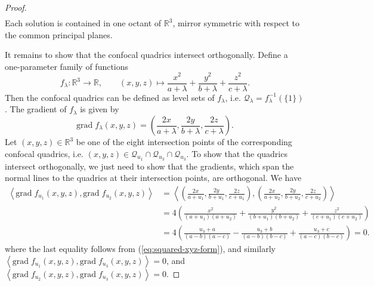\documentclass[10pt, a4paper]{article}
\theoremstyle{BoldTopSpacing}
\theoremstyle{BoldTopSpacing}
\theoremstyle{BoldTopSpacing}
\theoremstyle{BoldTopBottomSpacing}
\theoremstyle{BoldTopSpacing}
\theoremstyle{BoldTopBottomSpacing}
\theoremstyle{remark}
\begin{document}
\begin{proof}
\begin{equation}
\begin{aligned}
\end{aligned}
\end{equation}
Each solution is contained in one octant of $\mathbb{R}^3$, mirror symmetric with respect to the common principal planes. \par
It remains to show that the confocal quadrics intersect orthogonally. Define a one-parameter family of functions
\[
    f_{\lambda} : \mathbb{R}^3 \to \mathbb{R}, \quad \quad (x, y, z) \mapsto \frac{x^2}{a + \lambda} + \frac{y^2}{b + \lambda} + \frac{z^2}{c + \lambda}.
\]
Then the confocal quadrics can be defined as level sets of $f_{\lambda}$, i.e. $\mathcal{Q}_{\lambda} = f^{-1}_{\lambda}(\{1\})$. The gradient of $f_{\lambda}$ is given by
\[
    \text{grad} \; f_{\lambda}(x, y, z) = \left( \frac{2x}{a + \lambda}, \frac{2y}{b + \lambda}, \frac{2z}{c + \lambda} \right).
\]
Let $(x, y, z) \in \mathbb{R}^3$ be one of the eight intersection points of the corresponding confocal quadrics, i.e. $(x, y, z) \in \mathcal{Q}_{u_{1}} \cap \mathcal{Q}_{u_{3}} \cap \mathcal{Q}_{u_{3}}$. To show that the quadrics intersect orthogonally, we just need to show that the gradients, which span the normal lines to the quadrics at their intersection points, are orthogonal. We have
\begin{align*}
\left< \text{grad} \; f_{u_{1}}(x, y, z), \text{grad} \; f_{u_{2}}(x, y, z)  \right> &= \left< \left( \frac{2x}{a + u_{1}}, \frac{2y}{b + u_{1}}, \frac{2z}{c + u_{1}} \right), \left( \frac{2x}{a + u_{2}}, \frac{2y}{b + u_{2}}, \frac{2z}{c + u_{2}} \right) \right>  \\
&= 4 \left( \frac{x^2}{(a + u_{1})(a + u_{2})} + \frac{y^2}{(b + u_{1})(b + u_{2})} + \frac{z^2}{(c + u_{1})(c + u_{2})} \right) \\
&= 4 \left( \frac{u_{3} + a}{(a - b)(a - c)} - \frac{u_{3} + b}{(a - b)(b - c)} + \frac{u_{3} + c}{(a - c)(b - c)} \right) = 0.
\end{align*}
where the last equality follows from (\ref{eq:squared-xyz-form}), and similarly $\left< \text{grad} \; f_{u_{1}}(x, y, z), \text{grad} \; f_{u_{3}}(x, y, z)  \right> = 0$, and $\left< \text{grad} \; f_{u_{2}}(x, y, z), \text{grad} \; f_{u_{3}}(x, y, z)  \right> = 0$.
\end{proof}
\end{document}
